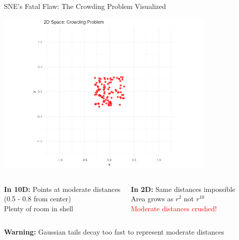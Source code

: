 \documentclass[aspectratio=169]{beamer}
\newcommand{\warning}[1]{\colorbox{red!10}{\textcolor{warningcolor}{\textbf{Warning:} #1}}}
\begin{document}
\begin{frame}{SNE's Fatal Flaw: The Crowding Problem Visualized}
\begin{center}
\includegraphics[width=0.8\textwidth]{./Figures/crowding_problem_animation.png}
\end{center}

\begin{columns}
\textbf{In 10D:} Points at moderate distances\\
(0.5 - 0.8 from center)\\
Plenty of room in shell

\textbf{In 2D:} Same distances impossible\\
Area grows as $r^2$ not $r^{10}$\\
\textcolor{red}{Moderate distances crushed!}
\end{columns}

\warning{Gaussian tails decay too fast to represent moderate distances}
\end{frame}
\end{document}
